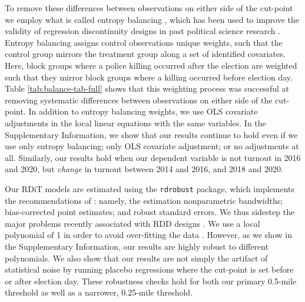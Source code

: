 \documentclass[12pt]{article}
\begin{document}
To remove these differences between observations on either side of the cut-point we employ what is called entropy balancing \citep{Hainmueller2012}, which has been used to improve the validity of regression discontinuity designs in past political science research \citep{Hainmueller2015}. Entropy balancing assigns control observations unique weights, such that the control group mirrors the treatment group along a set of identified covariates. Here, block groups where a police killing occurred after the election are weighted such that they mirror block groups where a killing occurred before election day. Table \ref{tab:balance-tab-full} shows that this weighting process was successful at removing systematic differences between observations on either side of the cut-point. In addition to entropy balancing weights, we use OLS covariate adjustments in the local linear equations with the same variables. In the Supplementary Information, we show that our results continue to hold even if we use only entropy balancing; only OLS covariate adjustment; or no adjustments at all. Similarly, our results hold when our dependent variable is not turnout in 2016 and 2020, but \textit{change} in turnout between 2014 and 2016, and 2018 and 2020.

Our RDiT models are estimated using the \texttt{rdrobust} \citep{Calonico2015} package, which implements the recommendations of \cite{Calonico2014}: namely, the estimation nonparametric bandwidths; bias-corrected point estimates; and robust standard errors. We thus sidestep the major problems recently associated with RDD designs \citep{Stommes2021}. We use a local polynomial of 1 in order to avoid over-fitting the data \citep{Cattaneo2019, Reny2021}. However, as we show in the Supplementary Information, our results are highly robust to different polynomials. We also show that our results are not simply the artifact of statistical noise by running placebo regressions where the cut-point is set before or after election day. These robustness checks hold for both our primary 0.5-mile threshold as well as a narrower, 0.25-mile threshold.
\end{document}
